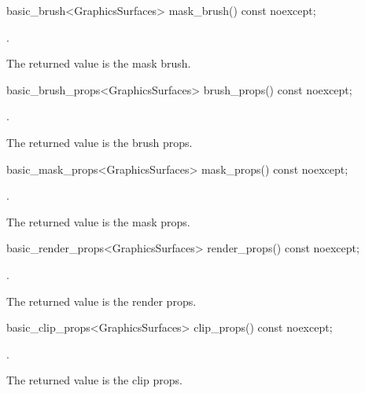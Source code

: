 %
\begin{itemdecl}
basic_brush<GraphicsSurfaces> mask_brush() const noexcept;
\end{itemdecl}
\begin{itemdescr}
\pnum
\returns {}.

\pnum
\remarks The returned value is the mask brush.
\end{itemdescr}

%
\begin{itemdecl}
basic_brush_props<GraphicsSurfaces> brush_props() const noexcept;
\end{itemdecl}
\begin{itemdescr}
\pnum
\returns {}.

\pnum
\remarks The returned value is the brush props.
\end{itemdescr}

%
\begin{itemdecl}
basic_mask_props<GraphicsSurfaces> mask_props() const noexcept;
\end{itemdecl}
\begin{itemdescr}
\pnum
\returns {}.

\pnum
\remarks The returned value is the mask props.
\end{itemdescr}

%
\begin{itemdecl}
basic_render_props<GraphicsSurfaces> render_props() const noexcept;
\end{itemdecl}
\begin{itemdescr}
\pnum
\returns {}.

\pnum
\remarks The returned value is the render props.
\end{itemdescr}

%
\begin{itemdecl}
basic_clip_props<GraphicsSurfaces> clip_props() const noexcept;
\end{itemdecl}
\begin{itemdescr}
\pnum
\returns {}.

\pnum
\remarks The returned value is the clip props.
\end{itemdescr}

